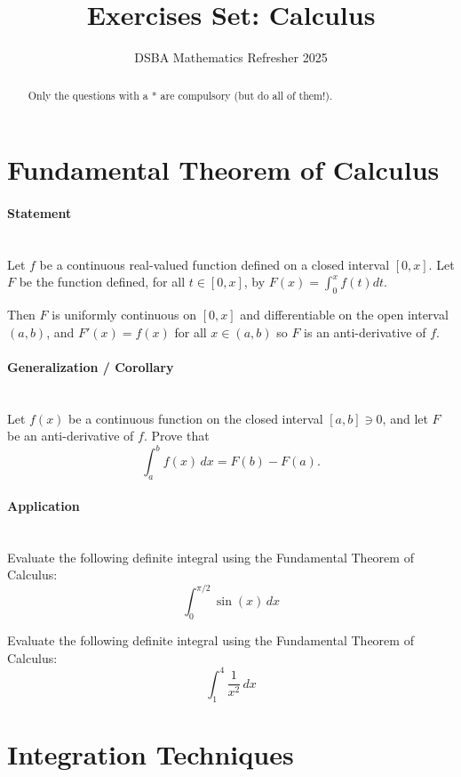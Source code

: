 \documentclass[]{article}
\title{Exercises Set: Calculus}
\author{DSBA Mathematics Refresher 2025}
\date{}
\begin{document}
	\maketitle
	
	\begin{abstract}
		Only the questions with a * are compulsory (but do all of them!).
	\end{abstract}
	
	\section{Fundamental Theorem of Calculus}
	\paragraph{Statement}\mbox{}\\
	Let $f$ be a continuous real-valued function defined on a closed interval $\left[ 0,x \right]$.
	Let $F$ be the function defined, for all $t \in \left[ 0,x \right]$, by $F(x) = \int_0^x f(t) dt$.
	
	Then $F$ is uniformly continuous on $\left[ 0,x \right]$ and differentiable on the open interval $\left( a,b \right)$, and $F'(x) = f(x)$ for all $x \in \left( a,b \right)$ so $F$ is an anti-derivative of $f$.
	
	\paragraph{Generalization / Corollary}\mbox{}\\
	Let \( f(x) \) be a continuous function on the closed interval \([a, b] \ni  0 \), and let \( F \) be an anti-derivative of \( f \).
	Prove that
	\[
	\int_a^b f(x) \, dx = F(b) - F(a).
	\]
	
	\paragraph{Application}\mbox{}\\
	Evaluate the following definite integral using the Fundamental Theorem of Calculus:
	\[
	\int_0^{\pi/2} \sin(x) \, dx
	\]
	
	Evaluate the following definite integral using the Fundamental Theorem of Calculus:
	\[
	\int_1^4 \frac{1}{x^2} \, dx
	\]
	
	
	\section{Integration Techniques}
\end{document}
